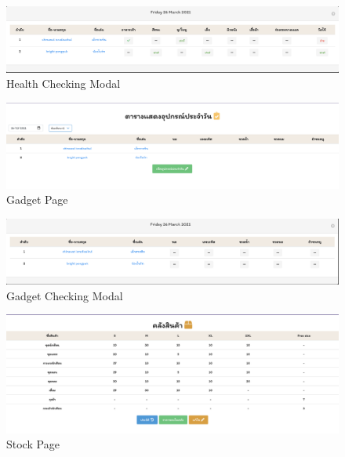 \begin{figure}
  \begin{center}
  \includegraphics[width=\linewidth]{images/checkHealth.png}
  \end{center}
  \caption[หน้าเช็คสุขภาพเด็ก]{Health Checking Modal}
  \label{fig:CheckHealth}
  \end{figure}

\begin{figure}
  \begin{center}
  \includegraphics[width=\linewidth]{images/Gadget.png}
  \end{center}
  \caption[หน้าแสดงข้อมูลอุปกรณ์เด็กรายวัน]{Gadget Page}
  \label{fig:Gadget}
  \end{figure}

\begin{figure}
  \begin{center}
  \includegraphics[width=\linewidth]{images/checkGadget.png}
  \end{center}
  \caption[หน้าเช็คอุปกรณ์เด็ก]{Gadget Checking Modal}
  \label{fig:CheckGadget}
  \end{figure}

\begin{figure}
  \begin{center}
  \includegraphics[width=\linewidth]{images/Stock.png}
  \end{center}
  \caption[หน้าแสดงคลังสินค้า]{Stock Page}
  \label{fig:Stock}
  \end{figure}

